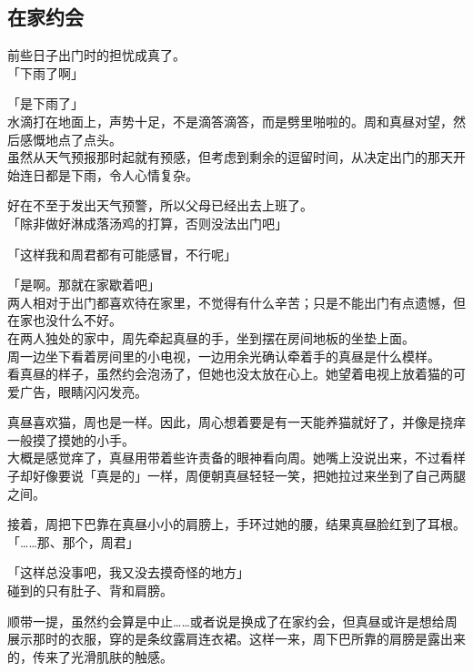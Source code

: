 \subsection{在家约会}

前些日子出门时的担忧成真了。\\

「下雨了啊」

「是下雨了」\\

水滴打在地面上，声势十足，不是滴答滴答，而是劈里啪啦的。周和真昼对望，然后感慨地点了点头。\\

虽然从天气预报那时起就有预感，但考虑到剩余的逗留时间，从决定出门的那天开始连日都是下雨，令人心情复杂。

好在不至于发出天气预警，所以父母已经出去上班了。\\

「除非做好淋成落汤鸡的打算，否则没法出门吧」

「这样我和周君都有可能感冒，不行呢」

「是啊。那就在家歇着吧」\\

两人相对于出门都喜欢待在家里，不觉得有什么辛苦；只是不能出门有点遗憾，但在家也没什么不好。\\

在两人独处的家中，周先牵起真昼的手，坐到摆在房间地板的坐垫上面。\\

周一边坐下看着房间里的小电视，一边用余光确认牵着手的真昼是什么模样。\\

看真昼的样子，虽然约会泡汤了，但她也没太放在心上。她望着电视上放着猫的可爱广告，眼睛闪闪发亮。

真昼喜欢猫，周也是一样。因此，周心想着要是有一天能养猫就好了，并像是挠痒一般摸了摸她的小手。\\

大概是感觉痒了，真昼用带着些许责备的眼神看向周。她嘴上没说出来，不过看样子却好像要说「真是的」一样，周便朝真昼轻轻一笑，把她拉过来坐到了自己两腿之间。

接着，周把下巴靠在真昼小小的肩膀上，手环过她的腰，结果真昼脸红到了耳根。\\

「……那、那个，周君」

「这样总没事吧，我又没去摸奇怪的地方」\\

碰到的只有肚子、背和肩膀。

顺带一提，虽然约会算是中止……或者说是换成了在家约会，但真昼或许是想给周展示那时的衣服，穿的是条纹露肩连衣裙。这样一来，周下巴所靠的肩膀是露出来的，传来了光滑肌肤的触感。\\

